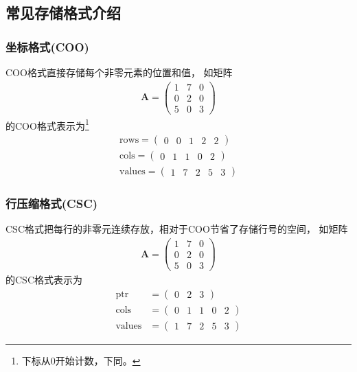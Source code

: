 \subsection{常见存储格式介绍}

\subsubsection{坐标格式(COO)}
COO格式直接存储每个非零元素的位置和值，
如矩阵
\begin{align*}
\bm{A}=\begin{pmatrix}
1 & 7 & 0\\
0 & 2 & 0\\
5 & 0 & 3
\end{pmatrix}
\end{align*}
的COO格式表示为\footnote{下标从0开始计数，下同。}
\begin{align*}
\mathrm{rows}=\begin{pmatrix}
0 & 0 & 1 & 2 & 2  
\end{pmatrix}
\\
\mathrm{cols}=\begin{pmatrix}
0 & 1 & 1 & 0 & 2
\end{pmatrix}
\\
\mathrm{values}=\begin{pmatrix}
1 & 7 & 2 & 5 & 3
\end{pmatrix}
\end{align*}



\subsubsection{行压缩格式(CSC)}
CSC格式把每行的非零元连续存放，相对于COO节省了存储行号的空间，
如矩阵
\begin{align*}
\bm{A}=\begin{pmatrix}
1 & 7 & 0\\
0 & 2 & 0\\
5 & 0 & 3
\end{pmatrix}
\end{align*}
的CSC格式表示为
\begin{align*}
\mathrm{ptr}&=\begin{pmatrix}
0 & 2 & 3  
\end{pmatrix}
\\
\mathrm{cols}&=\begin{pmatrix}
0 & 1 & 1 & 0 & 2
\end{pmatrix}
\\
\mathrm{values}&=\begin{pmatrix}
1 & 7 & 2 & 5 & 3
\end{pmatrix}
\end{align*}

